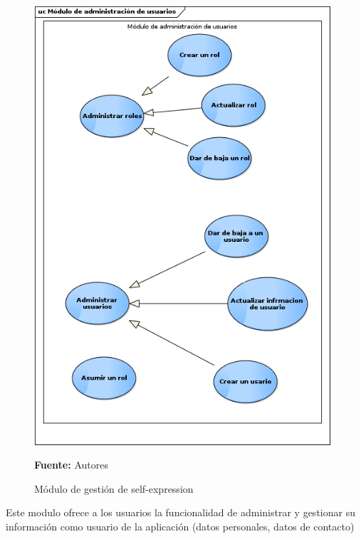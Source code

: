 \begin{figure}[!htb]
  \begin{center}
    \includegraphics[width=11cm]{./imagenes/casos_uso/gestion_usuarios.png}
    \caption{Módulo de gestión de self-expression}
    \label{fig:cu_self_shar}
    \textbf{Fuente:} Autores
  \end{center}
\end{figure}

Este modulo ofrece a los usuarios la funcionalidad de administrar y gestionar su información como usuario de la aplicación (datos personales, datos de contacto)
